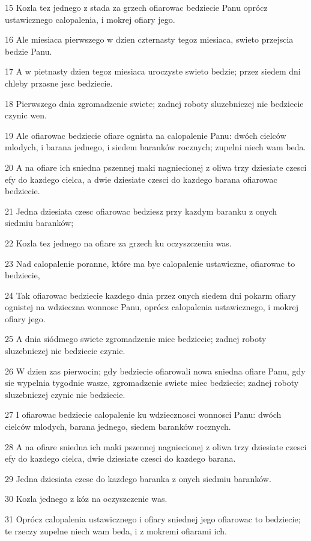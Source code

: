 \par 15 Kozla tez jednego z stada za grzech ofiarowac bedziecie Panu oprócz ustawicznego calopalenia, i mokrej ofiary jego.
\par 16 Ale miesiaca pierwszego w dzien czternasty tegoz miesiaca, swieto przejscia bedzie Panu.
\par 17 A w pietnasty dzien tegoz miesiaca uroczyste swieto bedzie; przez siedem dni chleby przasne jesc bedziecie.
\par 18 Pierwszego dnia zgromadzenie swiete; zadnej roboty sluzebniczej nie bedziecie czynic wen.
\par 19 Ale ofiarowac bedziecie ofiare ognista na calopalenie Panu: dwóch cielców mlodych, i barana jednego, i siedem baranków rocznych; zupelni niech wam beda.
\par 20 A na ofiare ich sniedna pszennej maki nagniecionej z oliwa trzy dziesiate czesci efy do kazdego cielca, a dwie dziesiate czesci do kazdego barana ofiarowac bedziecie.
\par 21 Jedna dziesiata czesc ofiarowac bedziesz przy kazdym baranku z onych siedmiu baranków;
\par 22 Kozla tez jednego na ofiare za grzech ku oczyszczeniu was.
\par 23 Nad calopalenie poranne, które ma byc calopalenie ustawiczne, ofiarowac to bedziecie,
\par 24 Tak ofiarowac bedziecie kazdego dnia przez onych siedem dni pokarm ofiary ognistej na wdzieczna wonnosc Panu, oprócz calopalenia ustawicznego, i mokrej ofiary jego.
\par 25 A dnia siódmego swiete zgromadzenie miec bedziecie; zadnej roboty sluzebniczej nie bedziecie czynic.
\par 26 W dzien zas pierwocin; gdy bedziecie ofiarowali nowa sniedna ofiare Panu, gdy sie wypelnia tygodnie wasze, zgromadzenie swiete miec bedziecie; zadnej roboty sluzebniczej czynic nie bedziecie.
\par 27 I ofiarowac bedziecie calopalenie ku wdziecznosci wonnosci Panu: dwóch cielców mlodych, barana jednego, siedem baranków rocznych.
\par 28 A na ofiare sniedna ich maki pszennej nagniecionej z oliwa trzy dziesiate czesci efy do kazdego cielca, dwie dziesiate czesci do kazdego barana.
\par 29 Jedna dziesiata czesc do kazdego baranka z onych siedmiu baranków.
\par 30 Kozla jednego z kóz na oczyszczenie was.
\par 31 Oprócz calopalenia ustawicznego i ofiary sniednej jego ofiarowac to bedziecie; te rzeczy zupelne niech wam beda, i z mokremi ofiarami ich.

